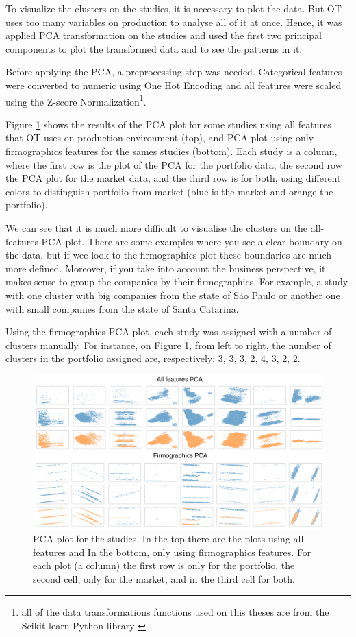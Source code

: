To visualize the clusters on the studies, it is necessary to plot the data. But OT uses too many variables on production to analyse all of it at once. Hence, it was applied PCA transformation on the studies and used the first two principal components to plot the transformed data and to see the patterns in it. 

Before applying the PCA, a preprocessing step was needed. Categorical features were converted to numeric using One Hot Encoding and all features were scaled using the Z-score Normalization\footnote{all of the data transformations functions used on this theses are from the Scikit-learn Python library \cite{scikit-learn}}.

Figure \ref{fig:pca-plot} shows the results of the PCA plot for some studies using all features that OT uses on production environment (top), and PCA plot using only firmographics features for the sames studies (bottom). Each study is a column, where the first row is the plot of the PCA for the portfolio data, the second row the PCA plot for the market data, and the third row is for both, using different colors to distinguish portfolio from market (blue is the market and orange the portfolio).

We can see that it is much more difficult to visualise the clusters on the all-features PCA plot. There are some examples where you see a clear boundary on the data, but if wee look to the firmographics plot these boundaries are much more defined. Moreover, if you take into account the business perspective, it makes sense to group the companies by their firmographics. For example, a study with one cluster with big companies from the state of São Paulo or another one with small companies from the state of Santa Catarina.

Using the firmographics PCA plot, each study was assigned with a number of clusters manually. For instance, on Figure \ref{fig:pca-plot}, from left to right, the number of clusters in the portfolio assigned are, respectively: 3, 3, 3, 2, 4, 3, 2, 2.  

\begin{figure}[h]
   \centering
   \includegraphics[width=\linewidth]{fig/ch3-pca-plot.png}
   \caption{PCA plot for the studies. In the top there are the plots using all features and In the bottom, only using firmographics features. For each plot (a column) the first row is only for the portfolio, the second cell, only for the market, and in the third cell for both.}
   \label{fig:pca-plot}
\end{figure}

